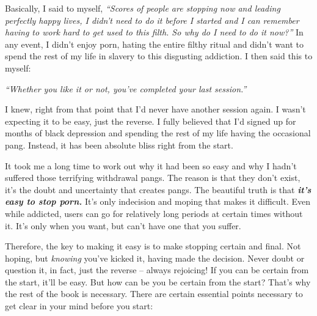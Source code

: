 \documentclass[
]{book}
\begin{document}
Basically, I said to myself, \emph{``Scores of people are stopping now and leading perfectly happy lives, I didn't need to do it before I started and I can remember having to work hard to get used to this filth. So why do I need to do it now?''} In any event, I didn't enjoy porn, hating the entire filthy ritual and didn't want to spend the rest of my life in slavery to this disgusting addiction. I then said this to myself:

\emph{``Whether you like it or not, you've completed your last session.''}

I knew, right from that point that I'd never have another session again. I wasn't expecting it to be easy, just the reverse. I fully believed that I'd signed up for months of black depression and spending the rest of my life having the occasional pang. Instead, it has been absolute bliss right from the start.

It took me a long time to work out why it had been so easy and why I hadn't suffered those terrifying withdrawal pangs. The reason is that they don't exist, it's the doubt and uncertainty that creates pangs. The beautiful truth is that \textbf{\emph{it's easy to stop porn.}} It's only indecision and moping that makes it difficult. Even while addicted, users can go for relatively long periods at certain times without it. It's only when you want, but can't have one that you suffer.

Therefore, the key to making it easy is to make stopping certain and final. Not hoping, but \emph{knowing} you've kicked it, having made the decision. Never doubt or question it, in fact, just the reverse -- always rejoicing! If you can be certain from the start, it'll be easy. But how can be you be certain from the start? That's why the rest of the book is necessary. There are certain essential points necessary to get clear in your mind before you start:
\end{document}
